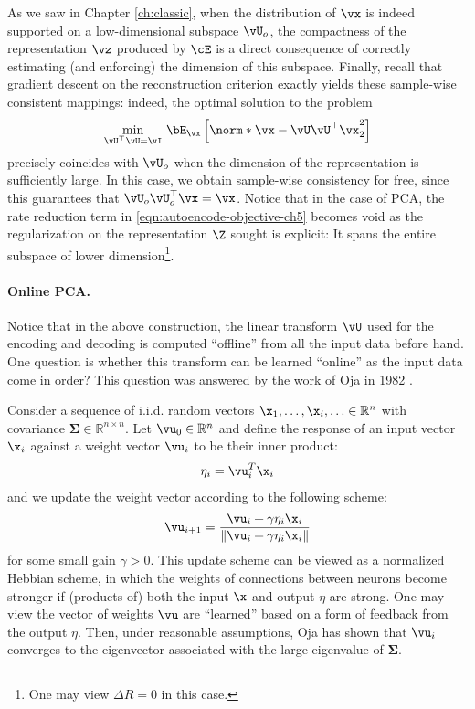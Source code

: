 \documentclass[../../book-main.tex]{subfiles}
\begin{document}
As we saw in Chapter \ref{ch:classic}, when the distribution of $\vx$ is indeed
supported on a low-dimensional subspace $\vU_o$, the compactness of
the representation
$\vz$ produced by $\cE$ is a direct consequence of correctly
estimating (and enforcing) the dimension of this subspace.  Finally,
recall that gradient descent on the reconstruction criterion exactly
yields these sample-wise consistent mappings: indeed, the optimal
solution to the problem
\begin{equation}\label{eq:pca-reconstruction-ch5}
  \min_{\vU^\top \vU = \vI}\, \bE_{\vx}\left[\norm*{\vx
  - \vU\vU^\top \vx}_2^2\right]
\end{equation}
precisely coincides with $\vU_o$ when the dimension of the representation is
sufficiently large. In this case, we obtain sample-wise consistency
for free, since this guarantees that $\vU_o\vU_o^\top \vx = \vx$.
Notice that in the case of PCA, the rate reduction term in
\eqref{eqn:autoencode-objective-ch5} becomes void as the regularization
on the representation $\Z$ sought is explicit: It spans the entire
subspace of lower dimension\footnote{One may view $\Delta R = 0$ in this case.}.

\paragraph{Online PCA.} Notice that in the above construction, the
linear transform $\vU$
used for the encoding and decoding is computed ``offline'' from all
the input data before hand. One question is whether this transform
can be learned ``online'' as the input data come in order? This
question was answered by the work of Oja in 1982 \cite{Oja1982SimplifiedNM}.
\begin{example} Consider a
  sequence of i.i.d. random vectors $\x_1, \ldots, \x_i, \ldots \in
  \mathbb{R}^n$ with covariance $\boldsymbol{\Sigma} \in
  \mathbb{R}^{n\times n}$. Let $\vu_0 \in \mathbb{R}^n$ and define
  the response of an input vector $\x_i$ against a weight vector
  $\vu_i$ to be their inner product:
  \begin{equation}
    \eta_i = \vu_i^T \x_i
  \end{equation}
  and we update the weight vector according to the following scheme:
  \begin{equation}
    \vu_{i+1} = \frac{\vu_i + \gamma \eta_i \x_i}{\|\vu_i + \gamma
    \eta_i \x_i\|}
    \label{eqn:Hebbian}
  \end{equation}
  for some small gain $\gamma >0$. This update scheme can be viewed
  as a normalized Hebbian scheme, in which the weights of connections
  between neurons become stronger if (products of) both the input
  $\x$ and output $\eta$ are strong. One may view the vector of
  weights $\vu$ are ``learned'' based on a form of feedback from the
  output $\eta$.
  Then, under reasonable assumptions, Oja \cite{Oja1982SimplifiedNM} has 
  shown that $\vu_i$ converges to the eigenvector associated with
  the large eigenvalue of $\boldsymbol{\Sigma}$.
\end{example}
\end{document}
